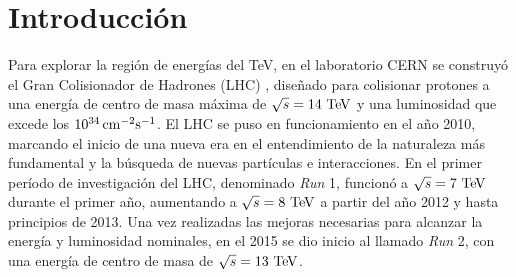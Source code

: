 \chapter*{Introducción}

Para explorar la región de energías del TeV, en el laboratorio CERN se construyó
el Gran Colisionador de Hadrones (LHC) \cite{Evans:1129806}, diseñado para
colisionar protones a una energía de centro de masa máxima de $\sqrt{s} = 14
\tev$ y una luminosidad que excede los $\unit[10^{34}]{cm^{-2}s^{-1}}$. El LHC
se puso en funcionamiento en el a\~no 2010, marcando el inicio de una nueva era
en el entendimiento de la naturaleza más fundamental y la búsqueda de nuevas
partículas e interacciones. En el primer período de investigación del LHC,
denominado \emph{Run} 1, funcionó a $\sqrt{s}=7\tev$ durante el primer a\~no,
aumentando a $\sqrt{s}=8\tev$ a partir del a\~no 2012 y hasta principios de
2013. Una vez realizadas las mejoras necesarias para alcanzar la energía y
luminosidad nominales, en el 2015 se dio inicio al llamado \emph{Run} 2, con una
energía de centro de masa de $\sqrt{s} = 13 \tev$.

